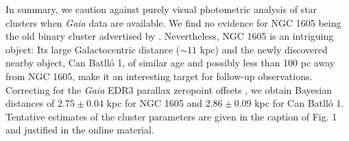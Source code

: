 \documentclass[RNAAS]{aastex631}
\begin{document}
In summary, we caution against purely visual photometric analysis of star clusters when {\it Gaia} data are available. We find no evidence for NGC 1605 being the old binary cluster advertised by \citet{Camargo2021}. Nevertheless, NGC 1605 is an intriguing object: Its large Galactocentric distance ($\sim 11$ kpc) and the newly discovered nearby object, Can Batlló 1, of similar age and possibly less than 100 pc away from NGC 1605, make it an interesting target for follow-up observations. Correcting for the {\it Gaia} EDR3 parallax zeropoint offsets \citep{Lindegren2021}, we obtain Bayesian distances of $2.75\pm 0.04$ kpc for NGC 1605 and $2.86\pm0.09$ kpc for Can Batlló 1. Tentative estimates of the cluster parameters are given in the caption of Fig. 1 and justified in the online material.



\vspace{-0.2cm}
{}

\end{document}

